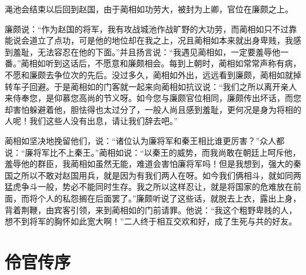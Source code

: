 \documentclass[12pt,UTF-8,openany]{ctexbook}
\begin{document}
\begin{normalsize}
    渑池会结束以后回到赵国，由于蔺相如功劳大，被封为上卿，官位在廉颇之上。
    
    廉颇说：“作为赵国的将军，我有攻战城池作战旷野的大功劳，而蔺相如只不过靠能说会道立了点功，可是他的地位却在我之上，况且蔺相如本来就出身卑贱，我感到羞耻，无法容忍在他的下面。”并且扬言说：“我遇见蔺相如，一定要羞辱他一番。”蔺相如听到这话后，不愿意和廉颇相会。每到上朝时，蔺相如常常声称有病，不愿和廉颇去争位次的先后。没过多久，蔺相如外出，远远看到廉颇，蔺相如就掉转车子回避。于是蔺相如的门客就一起来向蔺相如抗议说：“我们之所以离开亲人来侍奉您，是仰慕您高尚的节义呀。如今您与廉颇官位相同，廉颇传出坏话，而您却害怕躲避着他，胆怯得也太过分了，一般人尚且感到羞耻，更何况是身为将相的人呢！我们这些人没有出息，请让我们辞去吧。”
    
    蔺相如坚决地挽留他们，说：“诸位认为廉将军和秦王相比谁更厉害？”众人都说：“廉将军比不上秦王。”蔺相如说：“以秦王的威势，而我尚敢在朝廷上呵斥他，羞辱他的群臣，我蔺相如虽然无能，难道会害怕廉将军吗！但是我想到，强大的秦国之所以不敢对赵国用兵，就是因为有我们两人在呀。如今我们俩相斗，就如同两猛虎争斗一般，势必不能同时生存。我之所以这样忍让，就是将国家的危难放在前面，而将个人的私怨搁在后面罢了。”廉颇听说了这些话，就脱去上衣，露出上身，背着荆鞭，由宾客引领，来到蔺相如的门前请罪。他说：“我这个粗野卑贱的人，想不到将军的胸怀如此宽大啊！”二人终于相互交欢和好，成了生死与共的好友。
    
\end{normalsize}



\chapter{伶官传序}
\end{document}
